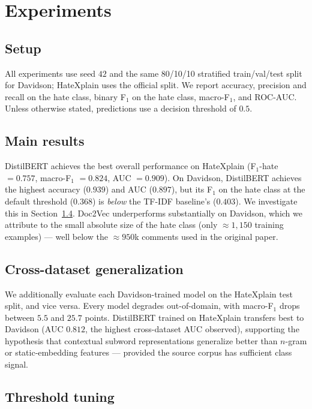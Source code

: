 \documentclass[11pt]{article}
\begin{document}
\section{Experiments}

\subsection{Setup}
All experiments use seed $42$ and the same 80/10/10 stratified train/val/test
split for Davidson; HateXplain uses the official split. We report accuracy,
precision and recall on the hate class, binary F$_1$ on the hate class,
macro-F$_1$, and ROC-AUC. Unless otherwise stated, predictions use a
decision threshold of $0.5$.

\subsection{Main results}



DistilBERT achieves the best overall performance on HateXplain
(F$_1$-hate $= 0.757$, macro-F$_1$ $= 0.824$, AUC $= 0.909$). On Davidson,
DistilBERT achieves the highest accuracy ($0.939$) and AUC ($0.897$), but
its F$_1$ on the hate class at the default threshold ($0.368$) is
\emph{below} the TF-IDF baseline's ($0.403$). We investigate this in
Section~\ref{sec:threshold}. Doc2Vec underperforms substantially on
Davidson, which we attribute to the small absolute size of the hate class
(only $\approx 1{,}150$ training examples) --- well below the $\approx 950$k
comments used in the original \citet{djuric2015hate} paper.

\subsection{Cross-dataset generalization}



We additionally evaluate each Davidson-trained model on the HateXplain test
split, and vice versa. Every model degrades out-of-domain, with macro-F$_1$
drops between $5.5$ and $25.7$ points. DistilBERT trained on HateXplain
transfers best to Davidson (AUC $0.812$, the highest cross-dataset AUC
observed), supporting the hypothesis that contextual subword
representations generalize better than $n$-gram or static-embedding
features --- provided the source corpus has sufficient class signal.

\subsection{Threshold tuning}
\label{sec:threshold}
\end{document}
